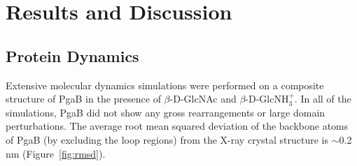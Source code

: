 \section{Results and Discussion}

\subsection{Protein Dynamics}

Extensive molecular dynamics simulations were performed on a composite structure of PgaB in the presence of $\beta$-D-GlcNAc and $\beta$-D-GlcNH$_{3}^{+}$. In all of the simulations, PgaB did not show any gross rearrangements or large domain perturbations. The average root mean squared deviation of the backbone atoms of PgaB (by excluding the loop regions) from the X-ray crystal structure is $\sim$0.2 nm (Figure~\ref{fig:rmsd}).

